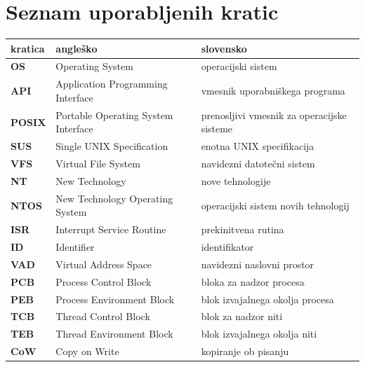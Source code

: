 \documentclass[a4paper,12pt,openright]{book}
\newcommand{\clearemptydoublepage}{\newpage{\pagestyle{empty}\cleardoublepage}}
\begin{document}
\pagestyle{empty}
\def\thepage{}%
\tableofcontents{}


\clearemptydoublepage


\chapter*{Seznam uporabljenih kratic}

\noindent\begin{tabular}{p{}|p{}|p{}}    %
{\bf kratica} & {\bf angleško}                     & {\bf slovensko}                            \\
\hline
{\bf OS}      & Operating System                    & operacijski sistem                         \\
{\bf API}     & Application Programming Interface   & vmesnik uporabniškega programa             \\
{\bf POSIX}   & Portable Operating System Interface & prenosljivi vmesnik za operacijske sisteme \\
{\bf SUS}     & Single UNIX Specification           & enotna UNIX specifikacija                  \\
{\bf VFS}     & Virtual File System                 & navidezni datotečni sistem                 \\
{\bf NT}      & New Technology                      & nove tehnologije                           \\
{\bf NTOS}    & New Technology Operating System     & operacijski sistem novih tehnologij        \\
{\bf ISR}     & Interrupt Service Routine           & prekinitvena rutina                        \\
{\bf ID}      & Identifier                          & identifikator                              \\
{\bf VAD}     & Virtual Address Space               & navidezni naslovni prostor                 \\
{\bf PCB}     & Process Control Block               & bloka za nadzor procesa                    \\
{\bf PEB}     & Process Environment Block           & blok izvajalnega okolja procesa            \\
{\bf TCB}     & Thread Control Block                & blok za nadzor niti                        \\
{\bf TEB}     & Thread Environment Block            & blok izvajalnega okolja niti               \\
{\bf CoW}     & Copy on Write                       & kopiranje ob pisanju                       \\
\end{tabular}
\end{document}
